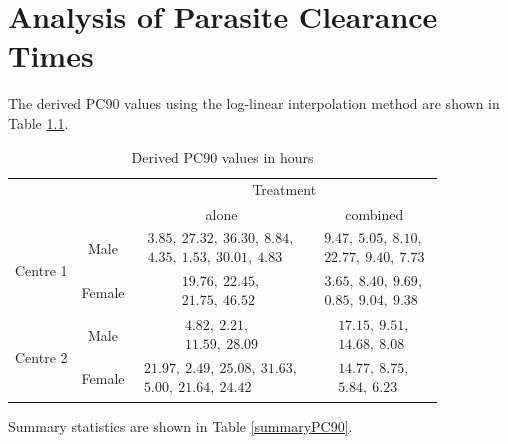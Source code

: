 \chapter{Analysis of Parasite Clearance Times}\label{ch:analysis}
The derived PC90 values using the log-linear interpolation method are shown in Table \ref{derivedPC90}.
\begin{table}[h]
\centering
\caption{Derived PC90 values in hours}\label{derivedPC90}
\begin{tabular}{|cc|c|c|}
\hline
&&\multicolumn{2}{c|}{Treatment}\\
&&alone&combined\\\hline
\multirow{2}{*}{Centre 1}&Male&$\begin{array}{c}3.85,\ 27.32,\ 36.30,\  8.84,\\4.35,\  1.53,\ 30.01,\  4.83\end{array}$&$\begin{array}{c}9.47,\  5.05,\  8.10,\\22.77,\  9.40,\  7.73\end{array}$\\\cline{2-4}
&Female&$\begin{array}{c}19.76,\ 22.45,\\21.75,\ 46.52\end{array}$&$\begin{array}{c}3.65,\ 8.40 ,\ 9.69,\\0.85,\ 9.04,\ 9.38\end{array}$\\\hline
\multirow{2}{*}{Centre 2}&Male&$\begin{array}{c}4.82,\ 2.21,\\11.59,\ 28.09\end{array}$&$\begin{array}{c}17.15,\ 9.51,\\14.68,\ 8.08\end{array}$\\\cline{2-4}
&Female&$\begin{array}{c}21.97,\ 2.49,\ 25.08,\ 31.63,\\5.00,\ 21.64,\ 24.42\end{array}$&$\begin{array}{c}14.77,\  8.75,\\5.84,\ 6.23\end{array}$\\\hline
\end{tabular}
\end{table}
Summary statistics are shown in Table \ref{summaryPC90}.
